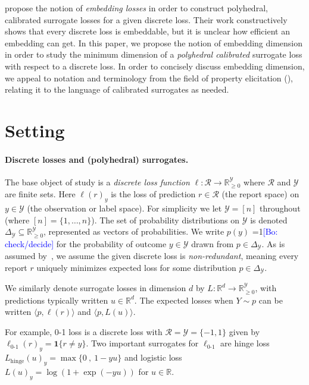 \documentclass[anon]{colt2020} %
\newcommand{\Comments}{1}
\newcommand{\mynote}[2]{\ifnum\Comments=1\textcolor{#1}{#2}\fi}
\newcommand{\bo}[1]{\mynote{blue}{[Bo: #1]}}
\newcommand{\reals}{\mathbb{R}}
\newcommand{\nonnegreals}{\reals_{\geq 0}}%
\newcommand{\simplex}{\Delta_\Y}
\newcommand{\R}{\mathcal{R}}
\newcommand{\Y}{\mathcal{Y}}
\newcommand{\hinge}{L_{\mathrm{hinge}}}
\newcommand{\ellzo}{\ell_{\text{0-1}}}
\newcommand{\risk}[1]{\underline{#1}}
\newcommand{\inprod}[2]{\langle #1, #2 \rangle}%
\newcommand{\Ind}[1]{\mathbf{1}\{#1\}}
\begin{document}
\cite{finocchiaro2019embedding} propose the notion of \emph{embedding losses} in order to construct polyhedral, calibrated surrogate losses for a given discrete loss.
Their work constructively shows that every discrete loss is embeddable, but it is unclear how efficient an embedding can get.
In this paper, we propose the notion of embedding dimension in order to study the minimum dimension of a \emph{polyhedral calibrated} surrogate loss with respect to a discrete loss.
In order to concisely discuss embedding dimension, we appeal to notation and terminology from the field of property elicitation (\cite{frongillo2015vector-valued, gneiting2007strictly, lambert2009eliciting, osband1985information-eliciting, savage1971elicitation}), relating it to the language of calibrated surrogates as needed.

\section{Setting}

\paragraph{Discrete losses and (polyhedral) surrogates.}

The base object of study is a \emph{discrete loss function} $\ell: \R \to \nonnegreals^{\Y}$ where $\R$ and $\Y$ are finite sets.
Here $\ell(r)_y$ is the loss of prediction $r \in \R$ (the report space) on $y \in \Y$ (the observation or label space).
For simplicity we let $\Y = [n]$ throughout (where $[n] = \{1,\ldots,n\}$).
The set of probability distributions on $\Y$ is denoted $\simplex\subseteq\nonnegreals^{\Y}$, represented as vectors of probabilities.
We write $p(y)$ \bo{check/decide} for the probability of outcome $y \in \Y$ drawn from $p \in \simplex$.
As is assumed by~\cite{finocchiaro2019embedding}, we assume the given discrete loss is \emph{non-redundant}, meaning every report $r$ uniquely minimizes expected loss for some distribution $p\in\simplex$.

We similarly denote surrogate losses in dimension $d$ by $L:\reals^d\to\nonnegreals^{\Y}$, with predictions typically written $u\in\reals^d$.
The expected losses when $Y \sim p$ can be written $\inprod{p}{\ell(r)}$ and $\inprod{p}{L(u)}$.

For example, 0-1 loss is a discrete loss with $\R = \Y = \{-1,1\}$
given by $\ellzo(r)_y = \Ind{r \neq y}$.%
Two important surrogates for $\ellzo$ are hinge loss $\hinge(u)_y = \max\{ 0 ~,~ 1-yu \}$ and logistic loss $L(u)_y = \log(1+\exp(-yu))$ for $u\in\reals$.
\end{document}
